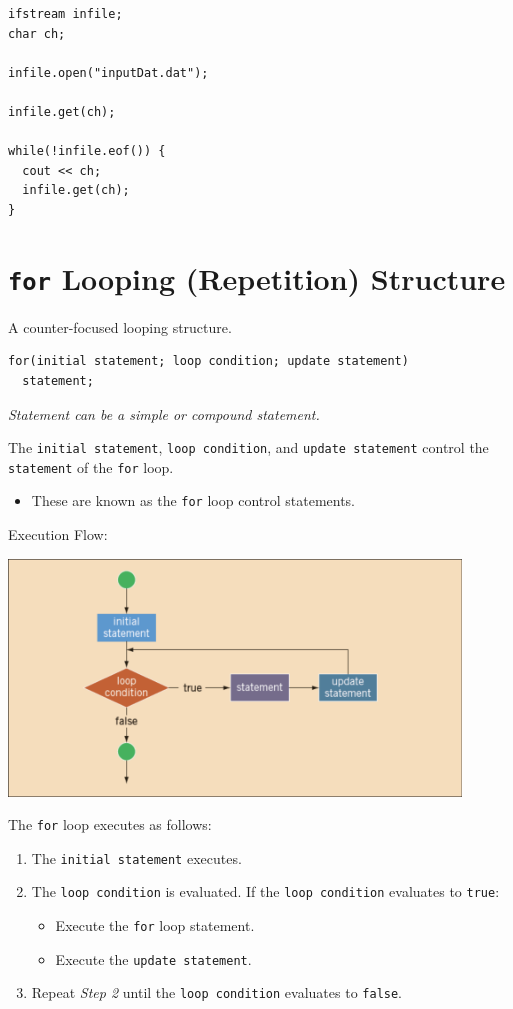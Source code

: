 \documentclass{article}
\begin{document}
\begin{lstlisting}[caption={\texttt{eof} Example}]
ifstream infile;
char ch;

infile.open("inputDat.dat");

infile.get(ch);

while(!infile.eof()) {
  cout << ch;
  infile.get(ch);
}
\end{lstlisting}

\section{\texttt{for} Looping (Repetition) Structure}

A counter-focused looping structure.

\begin{lstlisting}[caption={\texttt{for} Loop Syntax}]
for(initial statement; loop condition; update statement)
  statement;
\end{lstlisting}
\textit{Statement can be a simple or compound statement.}

\vspace{8pt}
The \texttt{initial statement}, \texttt{loop condition}, and \texttt{update
statement} control the \texttt{statement} of the \texttt{for} loop.
\begin{itemize}
  \item These are known as the \texttt{for} loop control statements.
\end{itemize}

\vspace{8pt}
Execution Flow:
\begin{center}
    \includegraphics[width=0.9\textwidth]{for-exec-flow.png}
\end{center}

The \texttt{for} loop executes as follows:
\begin{enumerate}
  \item The \texttt{initial statement} executes.
  \item The \texttt{loop condition} is evaluated. If the \texttt{loop condition} evaluates
to \texttt{true}:
  \begin{itemize}
    \item Execute the \texttt{for} loop statement.
    \item Execute the \texttt{update statement}.
  \end{itemize}
\item Repeat \textit{Step 2} until the \texttt{loop condition} evaluates to 
    \texttt{false}.
\end{enumerate}
\end{document}
